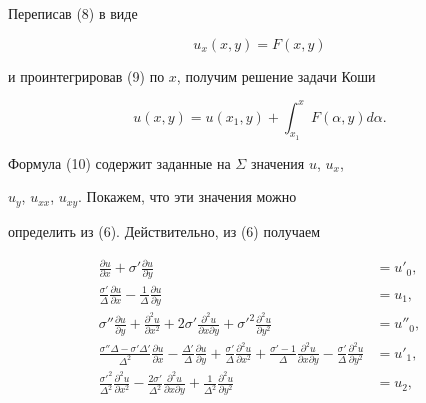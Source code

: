 Переписав (8) в виде


\begin{equation}


u_{x}(x,y)=F(x,y)


\end{equation}


и проинтегрировав (9) по $x$, получим решение задачи Коши


\begin{equation}


u(x,y)=u(x_{1},y)+\int_{x_{1}}^{x} F(\alpha,y)d\alpha.


\end{equation}





Формула (10) содержит заданные на $\Sigma$ значения $u$, $u_{x}$,


$u_{y}$, $u_{xx}$, $u_{xy}$. Покажем, что эти значения можно


определить из (6). Действительно, из (6) получаем


\begin{equation}


\begin{split}


\frac{\partial u}{\partial x}+\sigma'\frac{\partial u}{\partial y}&=


u'_{0},\\


\frac{\sigma'}{\Delta}\frac{\partial u}{\partial x}


-\frac{1}{\Delta}\frac{\partial u}{\partial y}&=


u_{1},\\


\sigma''\frac{\partial u}{\partial y}+


\frac{\partial^2 u}{\partial x^2}+


2\sigma'\frac{\partial^2 u}{\partial x \partial y}+


{\sigma'}^{2}\frac{\partial^2 u}{\partial y^2}&=


u''_{0},\\


\frac{\sigma''\Delta-\sigma'\Delta'}{\Delta^2}


\frac{\partial u}{\partial x}


-\frac{\Delta'}{\Delta}\frac{\partial u}{\partial y}


+\frac{\sigma'}{\Delta}\frac{\partial^2 u}{\partial x^2}+


\frac{\sigma'-1}{\Delta}\frac{\partial^2 u}{\partial x \partial y}-


\frac{\sigma'}{\Delta}\frac{\partial^2 u}{\partial y^2}&=


u'_{1},\\


\frac{{\sigma'}^2}{\Delta^2}\frac{\partial^2 u}{\partial x^2}


-\frac{2\sigma'}{\Delta^2}\frac{\partial^2 u}{\partial x \partial y}


+\frac{1}{\Delta^2}\frac{\partial^2 u}{\partial y^2}&=u_{2},


\end{split}


\end{equation}


